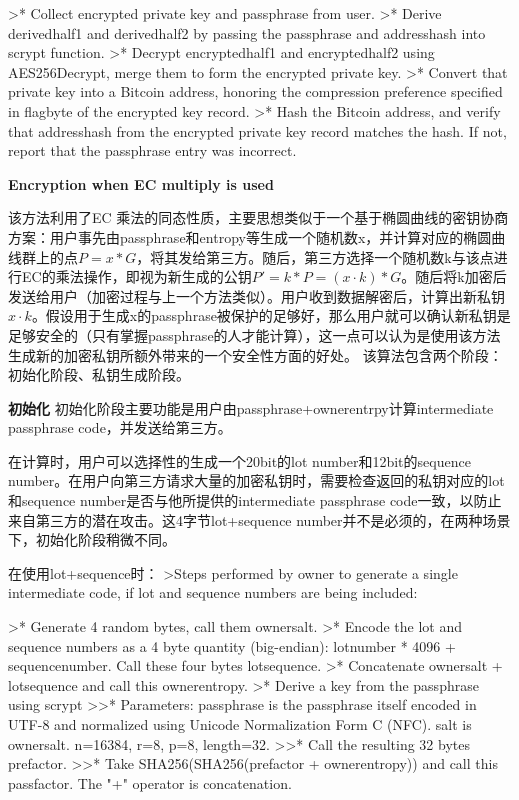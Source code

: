 >* Collect encrypted private key and passphrase from user.  
>* Derive derivedhalf1 and derivedhalf2 by passing the passphrase and addresshash into scrypt function.  
>* Decrypt encryptedhalf1 and encryptedhalf2 using AES256Decrypt, merge them to form the encrypted private key.  
>* Convert that private key into a Bitcoin address, honoring the compression preference specified in flagbyte of the encrypted key record.  
>* Hash the Bitcoin address, and verify that addresshash from the encrypted private key record matches the hash. If not, report that the passphrase entry was incorrect.  

\textbf{  Encryption when EC multiply is used}

该方法利用了EC 乘法的同态性质，主要思想类似于一个基于椭圆曲线的密钥协商方案：用户事先由passphrase和entropy等生成一个随机数x，并计算对应的椭圆曲线群上的点$P=x*G$，将其发给第三方。随后，第三方选择一个随机数k与该点进行EC的乘法操作，即视为新生成的公钥$P'=k*P=(x \cdot k)*G$。随后将k加密后发送给用户（加密过程与上一个方法类似）。用户收到数据解密后，计算出新私钥$x\cdot k$。假设用于生成x的passphrase被保护的足够好，那么用户就可以确认新私钥是足够安全的（只有掌握passphrase的人才能计算），这一点可以认为是使用该方法生成新的加密私钥所额外带来的一个安全性方面的好处。
该算法包含两个阶段：初始化阶段、私钥生成阶段。

\textbf{ 初始化}
初始化阶段主要功能是用户由passphrase+ownerentrpy计算intermediate passphrase code，并发送给第三方。  

在计算时，用户可以选择性的生成一个20bit的lot number和12bit的sequence number。在用户向第三方请求大量的加密私钥时，需要检查返回的私钥对应的lot和sequence number是否与他所提供的intermediate passphrase code一致，以防止来自第三方的潜在攻击。这4字节lot+sequence number并不是必须的，在两种场景下，初始化阶段稍微不同。 
 
在使用lot+sequence时：  
>Steps performed by owner to generate a single intermediate code, if lot and sequence numbers are being included:  

>* Generate 4 random bytes, call them ownersalt.
>* Encode the lot and sequence numbers as a 4 byte quantity (big-endian): lotnumber * 4096 + sequencenumber. Call these four bytes lotsequence.
>* Concatenate ownersalt + lotsequence and call this ownerentropy.
>* Derive a key from the passphrase using scrypt  
>>* Parameters: passphrase is the passphrase itself encoded in UTF-8 and normalized using Unicode Normalization Form C (NFC). salt is ownersalt. n=16384, r=8, p=8, length=32.
>>* Call the resulting 32 bytes prefactor.
>>* Take SHA256(SHA256(prefactor + ownerentropy)) and call this passfactor. The "+" operator is concatenation.  

